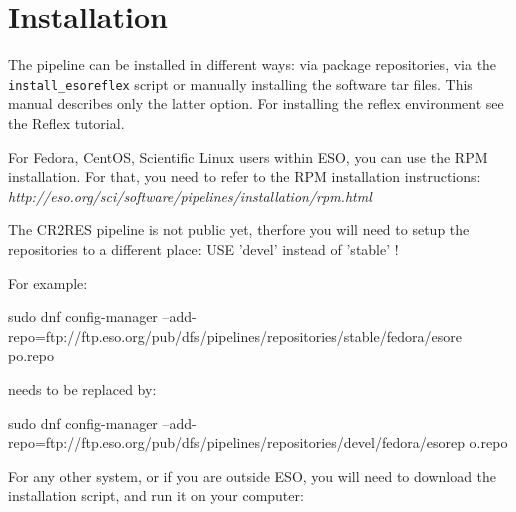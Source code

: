 \section{Installation}
\label{sec:installation}
\label{sec:install-howto}

The \instrument{} pipeline can be installed in different ways: via package
repositories, via the \texttt{install\_esoreflex} script or manually installing the
software tar files. This manual describes only the latter option. For
installing the reflex environment see the \instrument{} Reflex tutorial.

For Fedora, CentOS, Scientific Linux users within ESO, you can use the RPM
installation.
For that, you need to refer to the RPM installation instructions:
{\it http://eso.org/sci/software/pipelines/installation/rpm.html}

The CR2RES pipeline is not public yet, therfore you will need to setup the
repositories to a different place:
USE 'devel' instead of 'stable' !

For example:

sudo dnf config-manager
--add-repo=ftp://ftp.eso.org/pub/dfs/pipelines/repositories/stable/fedora/esore
po.repo

needs to be replaced by:

sudo dnf config-manager
--add-repo=ftp://ftp.eso.org/pub/dfs/pipelines/repositories/devel/fedora/esorep
o.repo

For any other system, or if you are outside ESO, you will need to download the
installation script, and run it on your computer:

